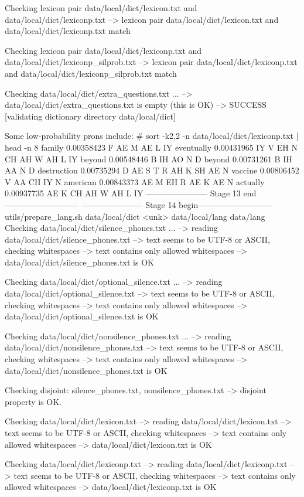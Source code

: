 Checking lexicon pair data/local/dict/lexicon.txt and data/local/dict/lexiconp.txt
--> lexicon pair data/local/dict/lexicon.txt and data/local/dict/lexiconp.txt match

Checking lexicon pair data/local/dict/lexiconp.txt and data/local/dict/lexiconp_silprob.txt
--> lexicon pair data/local/dict/lexiconp.txt and data/local/dict/lexiconp_silprob.txt match

Checking data/local/dict/extra_questions.txt ...
--> data/local/dict/extra_questions.txt is empty (this is OK)
--> SUCCESS [validating dictionary directory data/local/dict]

Some low-probability prons include: 
# sort -k2,2 -n data/local/dict/lexiconp.txt  | head -n 8
family 0.00358423 F AE M AE L IY
eventually 0.00431965 IY V EH N CH AH W AH L IY
beyond 0.00548446 B IH AO N D
beyond 0.00731261 B IH AA N D
destruction 0.00735294 D AE S T R AH K SH AE N
vaccine 0.00806452 V AA CH IY N
american 0.00843373 AE M EH R AE K AE N
actually 0.00937735 AE K CH AH W AH L IY
----------------------- Stage 13 end---------------------------
----------------------- Stage 14 begin---------------------------
utils/prepare_lang.sh data/local/dict <unk> data/local/lang data/lang
Checking data/local/dict/silence_phones.txt ...
--> reading data/local/dict/silence_phones.txt
--> text seems to be UTF-8 or ASCII, checking whitespaces
--> text contains only allowed whitespaces
--> data/local/dict/silence_phones.txt is OK

Checking data/local/dict/optional_silence.txt ...
--> reading data/local/dict/optional_silence.txt
--> text seems to be UTF-8 or ASCII, checking whitespaces
--> text contains only allowed whitespaces
--> data/local/dict/optional_silence.txt is OK

Checking data/local/dict/nonsilence_phones.txt ...
--> reading data/local/dict/nonsilence_phones.txt
--> text seems to be UTF-8 or ASCII, checking whitespaces
--> text contains only allowed whitespaces
--> data/local/dict/nonsilence_phones.txt is OK

Checking disjoint: silence_phones.txt, nonsilence_phones.txt
--> disjoint property is OK.

Checking data/local/dict/lexicon.txt
--> reading data/local/dict/lexicon.txt
--> text seems to be UTF-8 or ASCII, checking whitespaces
--> text contains only allowed whitespaces
--> data/local/dict/lexicon.txt is OK

Checking data/local/dict/lexiconp.txt
--> reading data/local/dict/lexiconp.txt
--> text seems to be UTF-8 or ASCII, checking whitespaces
--> text contains only allowed whitespaces
--> data/local/dict/lexiconp.txt is OK

